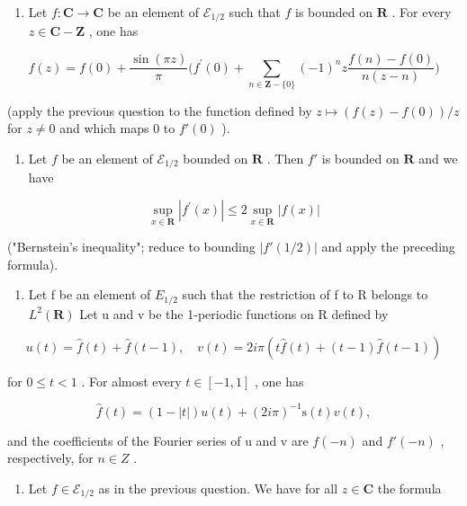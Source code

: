 \begin{enumerate}
\def\labelenumi{\alph{enumi})}
\setcounter{enumi}{1}
\tightlist
\item
  Let \(f \colon \mathbf{C} \to \mathbf{C}\) be an element of \(\mathcal{E}_{1/2}\) such that \(f\) is bounded on \(\mathbf{R}\) . For every \(z \in \mathbf{C} - \mathbf{Z}\) , one has
\end{enumerate}

\[
f (z) = f (0) + \frac {\sin (\pi z)}{\pi} \Big (f ^ {\prime} (0) + \sum_ {n \in \mathbf {Z} - \{0 \}} (- 1) ^ {n} z \frac {f (n) - f (0)}{n (z - n)} \Big)
\]

(apply the previous question to the function defined by \(z \mapsto (f(z) - f(0)) / z\) for \(z \neq 0\) and which maps 0 to \(f'(0)\) ).

\begin{enumerate}
\def\labelenumi{\alph{enumi})}
\setcounter{enumi}{2}
\tightlist
\item
  Let \(f\) be an element of \(\mathcal{E}_{1/2}\) bounded on \(\mathbf{R}\) . Then \(f'\) is bounded on \(\mathbf{R}\) and we have
\end{enumerate}

\[
\sup _ {x \in \mathbf {R}} | f ^ {\prime} (x) | \leqslant 2 \sup _ {x \in \mathbf {R}} | f (x) |
\]

("Bernstein's inequality"; reduce to bounding \(|f'(1/2)|\) and apply the preceding formula).

\begin{enumerate}
\def\labelenumi{\alph{enumi})}
\setcounter{enumi}{3}
\tightlist
\item
  Let f be an element of \(E_{1/2}\) such that the restriction of f to R belongs to \(L^{2}(\mathbf{R})\) Let u and v be the 1-periodic functions on R defined by
\end{enumerate}

\[
u (t) = \widehat {f} (t) + \widehat {f} (t - 1), \quad v (t) = 2 i \pi (t \widehat {f} (t) + (t - 1) \widehat {f} (t - 1))
\]

for \(0 \leqslant t < 1\) . For almost every \(t \in [-1, 1]\) , one has

\[
\widehat {f} (t) = (1 - | t |) u (t) + (2 i \pi) ^ {- 1} \mathrm{s} (t) v (t),
\]

and the coefficients of the Fourier series of u and v are \(f(-n)\) and \(f'(-n)\) , respectively, for \(n \in Z\) .

\begin{enumerate}
\def\labelenumi{\alph{enumi})}
\setcounter{enumi}{4}
\tightlist
\item
  Let \(f \in \mathcal{E}_{1/2}\) as in the previous question. We have for all \(z \in \mathbf{C}\) the formula
\end{enumerate}

